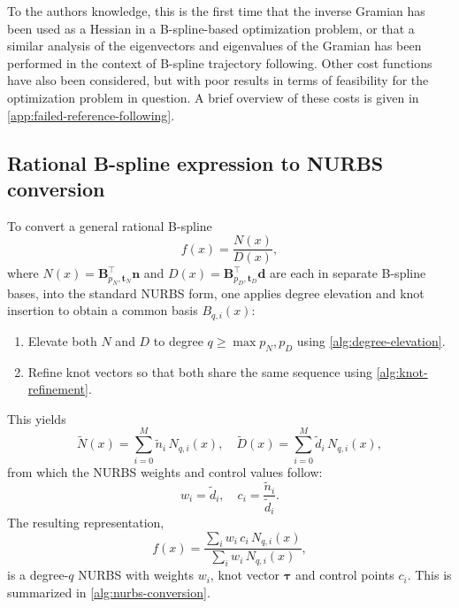 To the authors knowledge, this is the first time that the inverse Gramian has been used as a Hessian in a B-spline-based optimization problem, or that a similar analysis of the eigenvectors and eigenvalues of the Gramian has been performed in the context of B-spline trajectory following. Other cost functions have also been considered, but with poor results in terms of feasibility for the optimization problem in question. A brief overview of these costs is given in \cref{app:failed-reference-following}.



\FloatBarrier
\subsection{Rational B-spline expression to NURBS conversion}


To convert a general rational B-spline
$$
    f(x) = \frac{N(x)}{D(x)},
$$
where $N(x)=\mathbf B_{p_N,\mathbf t_N}^\top\mathbf n$ and $D(x)=\mathbf B_{p_D,\mathbf t_D}^\top\mathbf d$ are each in separate B-spline bases, into the standard NURBS form, one applies degree elevation and knot insertion \citep{Piegl1997} to obtain a common basis ${B_{q,i}(x)}$:
\begin{enumerate}
    \item Elevate both $N$ and $D$ to degree $q\ge\max{p_N,p_D}$ using \cref{alg:degree-elevation}.
    \item Refine knot vectors so that both share the same sequence using \cref{alg:knot-refinement}.
\end{enumerate}
This yields
$$
    \widetilde N(x) = \sum_{i=0}^M \tilde n_i\,N_{q,i}(x),\quad \widetilde D(x) = \sum_{i=0}^M \tilde d_i\,N_{q,i}(x),
$$
from which the NURBS weights and control values follow:
$$
    w_i = \tilde d_i, \quad
    c_i = \frac{\tilde n_i}{\tilde d_i}.
$$
The resulting representation,
$$
    f(x) = \frac{\sum_i w_i\,c_i\,N_{q,i}(x)}{\sum_i w_i\,N_{q,i}(x)},
$$
is a degree-$q$ NURBS with weights $w_i$, knot vector $\boldsymbol{\tau}$ and control points $c_i$. This is summarized in \cref{alg:nurbs-conversion}.


